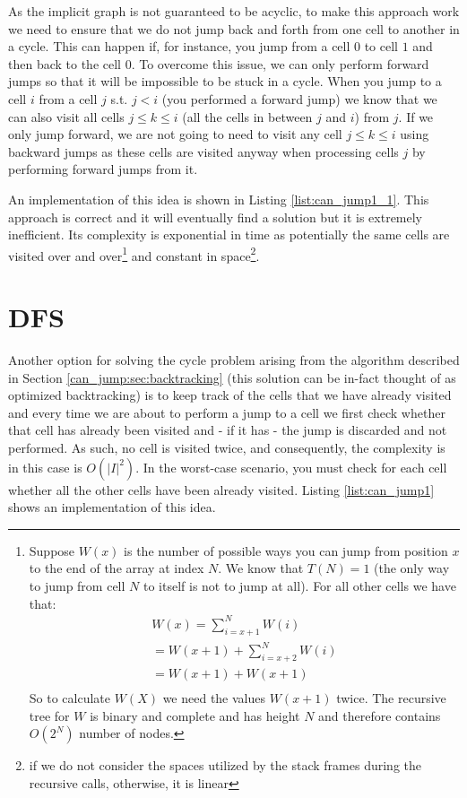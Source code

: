 As the implicit graph is not guaranteed to be acyclic, to make this
approach work we need to ensure that we do not jump back and forth from one cell to another in a
cycle. 
This can happen if, for instance,  you jump from a cell $0$ to cell $1$ and then back to the cell
$0$. To overcome this issue, we can only perform forward jumps so that it will be impossible
to be stuck in a cycle.
When you jump to a cell $i$ from a cell $j$ s.t. $j < i$ (you performed a forward jump) we know that we can also visit all cells $ j \leq
k \leq i$ (all the cells in between $j$ and $i$) from $j$.
If we only jump forward, we are not going to need to visit any cell $ j \leq k \leq i$ using backward jumps as these cells are visited anyway when processing
cells $j$ by performing forward jumps from it.

An implementation of this idea is shown in Listing
\ref{list:can_jump1_1}. 
This approach is correct and it will eventually find a solution but it is
extremely inefficient. Its complexity is exponential in time as potentially the same cells are
visited over and over\footnote{Suppose $W(x)$ is the number of possible ways you can jump from
position $x$ to the end of the array at index $N$. We know that $T(N) = 1$ (the only way to jump
from cell $N$ to itself is not to jump at all). For all other cells we have that:
    \begin{align*}
        W(x) = \sum_{i=x+1}^N W(i) \\
         = W(x+1) + \sum_{i=x+2}^N W(i) \\
         = W(x+1) + W(x+1) \\
      \end{align*}
    So to calculate $W(X)$ we need the values  $W(x+1)$ twice. The recursive tree for
    $W$ is binary and complete and has height $N$ and therefore contains $O(2^N)$ number of nodes.}
    and constant in space\footnote{if we do not consider the spaces utilized by the stack frames
    during the recursive calls, otherwise, it is linear}.

    
 
\section{DFS}
\label{can_jump:sec:DFS}
Another option for solving the cycle problem arising from the algorithm described in Section
\ref{can_jump:sec:backtracking} (this solution can be in-fact thought of as optimized backtracking)
is to keep track of the cells that we have already visited and every time we are about to perform a
jump to a cell we first check whether that cell has already been visited and  - if it has - 
the jump is discarded and not performed. As such, no cell is visited twice, and consequently, the complexity is in this case is $O(|I|^2)$. In the worst-case scenario, you must check for each
cell whether all the other cells have been already visited. Listing \ref{list:can_jump1} shows an
implementation of this idea. 


